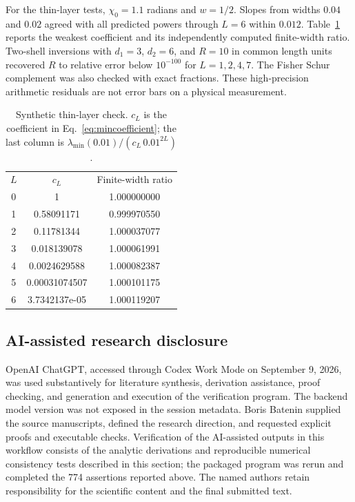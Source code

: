 \documentclass[aps,prd,reprint,amsmath,amssymb,nofootinbib,
longbibliography]{revtex4-2}
\begin{document}
For the thin-layer tests, $\chi_0=1.1$ radians and $w=1/2$.
Slopes from widths $0.04$ and $0.02$ agreed with all predicted powers
through $L=6$ within $0.012$. Table~\ref{tab:thin} reports the weakest
coefficient and its independently computed finite-width ratio.
Two-shell inversions with $d_1=3$, $d_2=6$, and $R=10$ in common length
units recovered $R$ to relative error below $10^{-100}$ for
$L=1,2,4,7$. The Fisher Schur complement was also checked with exact
fractions. These high-precision arithmetic residuals are not error bars
on a physical measurement.

\begin{table}[t]
\caption{Synthetic thin-layer check. $c_L$ is the coefficient in
Eq.~\eqref{eq:mincoefficient}; the last column is
$\lambda_{\min}(0.01)/(c_L\,0.01^{2L})$.}
\label{tab:thin}
\begin{ruledtabular}
\begin{tabular}{ccc}
$L$ & $c_L$ & Finite-width ratio\\
0 & 1 & 1.000000000 \\
1 & 0.58091171 & 0.999970550 \\
2 & 0.11781344 & 1.000037077 \\
3 & 0.018139078 & 1.000061991 \\
4 & 0.0024629588 & 1.000082387 \\
5 & 0.00031074507 & 1.000101175 \\
6 & 3.7342137e-05 & 1.000119207 \\
\end{tabular}
\end{ruledtabular}
\end{table}


\subsection{AI-assisted research disclosure}
OpenAI ChatGPT, accessed through Codex Work Mode on September 9, 2026,
was used substantively for literature synthesis, derivation assistance,
proof checking, and generation and execution of the verification program.
The backend model version was not exposed in the session metadata. Boris
Batenin supplied the source manuscripts, defined the research direction,
and requested explicit proofs and executable checks. Verification of the
AI-assisted outputs in this workflow consists of the analytic derivations
and reproducible numerical consistency tests described in this section;
the packaged program was rerun and completed the 774 assertions reported
above. The named authors retain responsibility for the scientific content
and the final submitted text.
\end{document}
